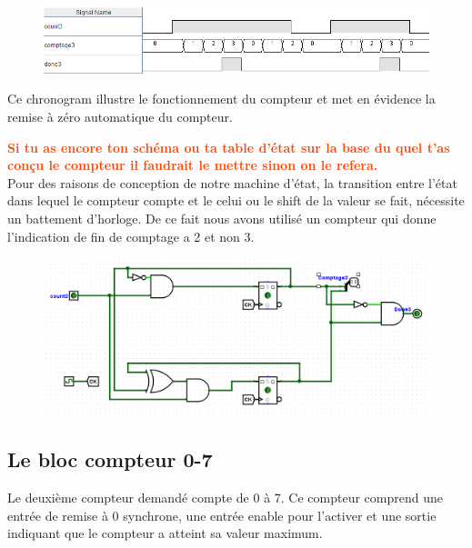 \documentclass[a4paper]{article} %
\newcommand{\red}[1]{\textbf{\textcolor{OrangeRed}{#1}}}
\begin{document}
\begin{tcolorbox}[colframe=Monokaimagenta,colback=white, breakable, enhanced]
\begin{figure}[H]
	\centering
	\includegraphics[width=\textwidth]{src/chrono_CPT3_1}
	\label{fig:chrono_CPT_03_1}
\end{figure}
Ce chronogram illustre le fonctionnement du compteur et met en évidence la remise à zéro automatique du compteur.

\red{Si tu as encore ton schéma ou ta table d'état sur la base du quel t'as conçu le compteur il faudrait le mettre sinon on le refera.}\\

Pour des raisons de conception de notre machine d'état, la transition entre l'état dans lequel le compteur compte et le celui ou le shift de la valeur se fait, nécessite un battement d'horloge. De ce fait nous avons utilisé un compteur qui donne l'indication de fin de comptage a 2 et non 3.
\begin{figure}[H]
	\centering
	\includegraphics[width=\textwidth]{src/CPT_03_2}
	\label{fig:CPT_03_2}
\end{figure}


\end{tcolorbox}
\subsection{Le bloc compteur 0-7}
Le deuxième compteur demandé compte de 0 à 7. Ce compteur comprend une entrée de remise à 0 synchrone, une entrée enable pour l’activer et une sortie indiquant que le compteur a atteint sa valeur maximum.
\end{document}
